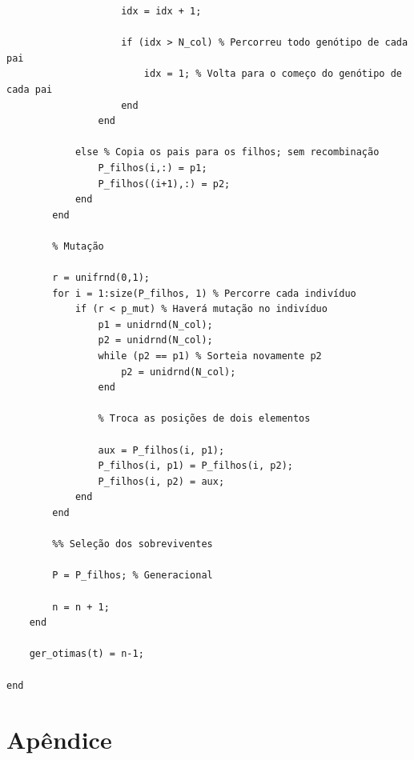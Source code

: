 \documentclass{report}
\begin{document}
\begin{lstlisting}
                    idx = idx + 1;
                    
                    if (idx > N_col) % Percorreu todo genótipo de cada pai
                        idx = 1; % Volta para o começo do genótipo de cada pai
                    end
                end
                
            else % Copia os pais para os filhos; sem recombinação
                P_filhos(i,:) = p1;
                P_filhos((i+1),:) = p2;
            end
        end
        
        % Mutação
        
        r = unifrnd(0,1);
        for i = 1:size(P_filhos, 1) % Percorre cada indivíduo
            if (r < p_mut) % Haverá mutação no indivíduo
                p1 = unidrnd(N_col);
                p2 = unidrnd(N_col);
                while (p2 == p1) % Sorteia novamente p2
                    p2 = unidrnd(N_col);
                end
        
                % Troca as posições de dois elementos

                aux = P_filhos(i, p1); 
                P_filhos(i, p1) = P_filhos(i, p2);
                P_filhos(i, p2) = aux;
            end
        end

        %% Seleção dos sobreviventes

        P = P_filhos; % Generacional
                 
        n = n + 1;
    end

    ger_otimas(t) = n-1;

end

	\end{lstlisting}

	\section*{Apêndice}
	
\end{document}
